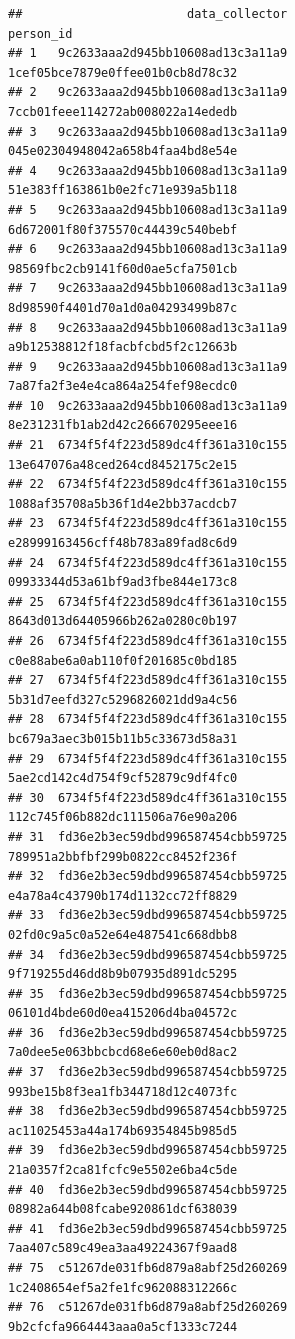 \documentclass[]{article}
\begin{document}
\begin{verbatim}
##                       data_collector                            person_id
## 1   9c2633aaa2d945bb10608ad13c3a11a9     1cef05bce7879e0ffee01b0cb8d78c32
## 2   9c2633aaa2d945bb10608ad13c3a11a9     7ccb01feee114272ab008022a14ededb
## 3   9c2633aaa2d945bb10608ad13c3a11a9     045e02304948042a658b4faa4bd8e54e
## 4   9c2633aaa2d945bb10608ad13c3a11a9     51e383ff163861b0e2fc71e939a5b118
## 5   9c2633aaa2d945bb10608ad13c3a11a9     6d672001f80f375570c44439c540bebf
## 6   9c2633aaa2d945bb10608ad13c3a11a9     98569fbc2cb9141f60d0ae5cfa7501cb
## 7   9c2633aaa2d945bb10608ad13c3a11a9     8d98590f4401d70a1d0a04293499b87c
## 8   9c2633aaa2d945bb10608ad13c3a11a9     a9b12538812f18facbfcbd5f2c12663b
## 9   9c2633aaa2d945bb10608ad13c3a11a9     7a87fa2f3e4e4ca864a254fef98ecdc0
## 10  9c2633aaa2d945bb10608ad13c3a11a9     8e231231fb1ab2d42c266670295eee16
## 21  6734f5f4f223d589dc4ff361a310c155     13e647076a48ced264cd8452175c2e15
## 22  6734f5f4f223d589dc4ff361a310c155     1088af35708a5b36f1d4e2bb37acdcb7
## 23  6734f5f4f223d589dc4ff361a310c155     e28999163456cff48b783a89fad8c6d9
## 24  6734f5f4f223d589dc4ff361a310c155     09933344d53a61bf9ad3fbe844e173c8
## 25  6734f5f4f223d589dc4ff361a310c155     8643d013d64405966b262a0280c0b197
## 26  6734f5f4f223d589dc4ff361a310c155     c0e88abe6a0ab110f0f201685c0bd185
## 27  6734f5f4f223d589dc4ff361a310c155     5b31d7eefd327c5296826021dd9a4c56
## 28  6734f5f4f223d589dc4ff361a310c155     bc679a3aec3b015b11b5c33673d58a31
## 29  6734f5f4f223d589dc4ff361a310c155     5ae2cd142c4d754f9cf52879c9df4fc0
## 30  6734f5f4f223d589dc4ff361a310c155     112c745f06b882dc111506a76e90a206
## 31  fd36e2b3ec59dbd996587454cbb59725     789951a2bbfbf299b0822cc8452f236f
## 32  fd36e2b3ec59dbd996587454cbb59725     e4a78a4c43790b174d1132cc72ff8829
## 33  fd36e2b3ec59dbd996587454cbb59725     02fd0c9a5c0a52e64e487541c668dbb8
## 34  fd36e2b3ec59dbd996587454cbb59725     9f719255d46dd8b9b07935d891dc5295
## 35  fd36e2b3ec59dbd996587454cbb59725     06101d4bde60d0ea415206d4ba04572c
## 36  fd36e2b3ec59dbd996587454cbb59725     7a0dee5e063bbcbcd68e6e60eb0d8ac2
## 37  fd36e2b3ec59dbd996587454cbb59725     993be15b8f3ea1fb344718d12c4073fc
## 38  fd36e2b3ec59dbd996587454cbb59725     ac11025453a44a174b69354845b985d5
## 39  fd36e2b3ec59dbd996587454cbb59725     21a0357f2ca81fcfc9e5502e6ba4c5de
## 40  fd36e2b3ec59dbd996587454cbb59725     08982a644b08fcabe920861dcf638039
## 41  fd36e2b3ec59dbd996587454cbb59725     7aa407c589c49ea3aa49224367f9aad8
## 75  c51267de031fb6d879a8abf25d260269     1c2408654ef5a2fe1fc962088312266c
## 76  c51267de031fb6d879a8abf25d260269     9b2cfcfa9664443aaa0a5cf1333c7244

\end{verbatim}
\end{document}
